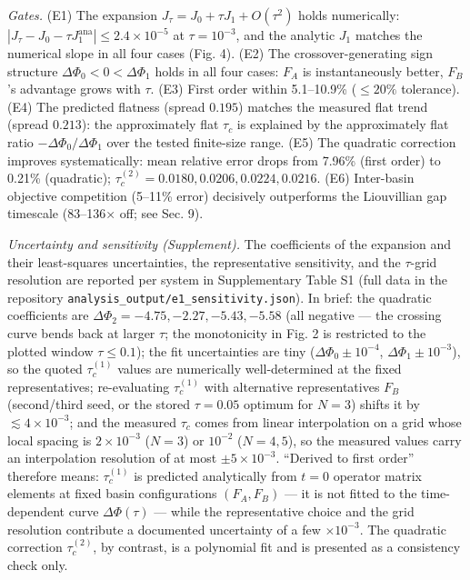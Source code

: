 \documentclass[
]{article}
\begin{document}
\emph{Gates.} (E1) The expansion \(J_\tau = J_0 + \tau J_1 + O(\tau^2)\)
holds numerically:
\(|J_\tau - J_0 - \tau J_1^{\mathrm{ana}}| \le 2.4\times10^{-5}\) at
\(\tau=10^{-3}\), and the analytic \(J_1\) matches the numerical slope
in all four cases (Fig. 4). (E2) The crossover-generating sign structure
\(\Delta\Phi_0 < 0 < \Delta\Phi_1\) holds in all four cases: \(F_A\) is
instantaneously better, \(F_B\)'s advantage grows with \(\tau\). (E3)
First order within 5.1--10.9\% (\(\le 20\%\) tolerance). (E4) The
predicted flatness (spread \(0.195\)) matches the measured flat trend
(spread \(0.213\)): the approximately flat \(\tau_c\) is explained by
the approximately flat ratio \(-\Delta\Phi_0/\Delta\Phi_1\) over the
tested finite-size range. (E5) The quadratic correction improves
systematically: mean relative error drops from 7.96\% (first order) to
0.21\% (quadratic); \(\tau_c^{(2)} = 0.0180, 0.0206,
0.0224, 0.0216\). (E6) Inter-basin objective competition (5--11\% error)
decisively outperforms the Liouvillian gap timescale (83--136× off; see
Sec. 9).

\emph{Uncertainty and sensitivity (Supplement).} The coefficients of the
expansion and their least-squares uncertainties, the representative
sensitivity, and the \(\tau\)-grid resolution are reported per system in
Supplementary Table S1 (full data in the repository
\texttt{analysis\_output/e1\_sensitivity.json}). In brief: the quadratic
coefficients are \(\Delta\Phi_2 = -4.75, -2.27, -5.43, -5.58\) (all
negative --- the crossing curve bends back at larger \(\tau\); the
monotonicity in Fig. 2 is restricted to the plotted window
\(\tau \le 0.1\)); the fit uncertainties are tiny
(\(\Delta\Phi_0 \pm 10^{-4}\), \(\Delta\Phi_1 \pm 10^{-3}\)), so the
quoted \(\tau_c^{(1)}\) values are numerically well-determined at the
fixed representatives; re-evaluating \(\tau_c^{(1)}\) with alternative
representatives \(F_B\) (second/third seed, or the stored \(\tau=0.05\)
optimum for \(N=3\)) shifts it by \(\lesssim 4\times10^{-3}\); and the
measured \(\tau_c\) comes from linear interpolation on a grid whose
local spacing is \(2\times10^{-3}\) (\(N=3\)) or \(10^{-2}\)
(\(N=4,5\)), so the measured values carry an interpolation resolution of
at most \(\pm 5\times10^{-3}\). ``Derived to first order'' therefore
means: \(\tau_c^{(1)}\) is predicted analytically from \(t=0\) operator
matrix elements at fixed basin configurations \((F_A,F_B)\) --- it is
not fitted to the time-dependent curve \(\Delta\Phi(\tau)\) --- while
the representative choice and the grid resolution contribute a
documented uncertainty of a few \(\times10^{-3}\). The quadratic
correction \(\tau_c^{(2)}\), by contrast, is a polynomial fit and is
presented as a consistency check only.
\end{document}
